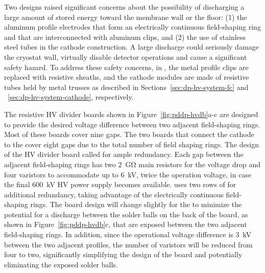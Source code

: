 Two  designs  raised significant concerns about the possibility of discharging a large amount of stored energy toward the membrane wall or the floor:  (1) the aluminum profile electrodes that form an electrically continuous field-shaping ring and that are interconnected with aluminum clips, and (2) the use of stainless steel tubes in the cathode construction. A large  discharge could seriously damage the cryostat wall, virtually disable detector operations and cause a significant safety hazard. 
To address these safety concerns, in  , the metal profile clips are replaced with resistive sheaths, and the cathode modules are made of resistive tubes held by metal trusses as described in Sections~\ref{sec:dp-hv-system-fc} and ~\ref{sec:dp-hv-system-cathode}, respectively.

The  resistive HV divider boards shown in Figure~\ref{fig:pddp-hvdb}a-c are designed to provide the desired voltage difference between two adjacent field-shaping rings. 
Most of these boards cover nine gaps. 
The two boards that connect the cathode to the  cover eight  gaps due to %
the total number of field shaping rings. %
The design of the HV divider board called for ample redundancy.  
Each gap between the adjacent field-shaping rings has two \SI{2}{\giga\ohm} main resistors for the voltage drop and four varistors to accommodate up to \SI{6}{\kV}, twice the operation voltage, in case the final \SI{600}{\kV} HV power supply becomes available.
 uses two rows of  for additional redundancy, taking advantage of the electrically continuous field-shaping rings.
The board design will change slightly for the  to minimize the potential for a discharge between the solder balls on the back of the board, as shown in Figure~\ref{fig:pddp-hvdb}c, that are exposed  between the two adjacent field-shaping rings. 
In addition, since the operational voltage difference is \SI{3}{\kV} between the two adjacent profiles, the number of varistors will be reduced from four to two, significantly simplifying the design of the board and potentially eliminating the exposed solder balls.

